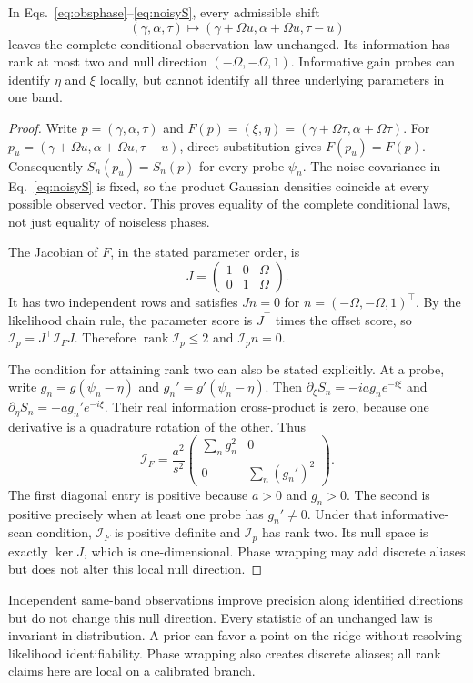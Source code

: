 \documentclass[submission,nolinenumbers]{esj}
\DeclareMathOperator{\rank}{rank}
\DeclareMathOperator{\Ker}{ker}
\begin{document}
\begin{proposition}\label{prop:orbit}
In Eqs.~\eqref{eq:obsphase}--\eqref{eq:noisyS}, every admissible shift
\[
(\gamma,\alpha,\tau)\longmapsto(\gamma+\Omega u,\alpha+\Omega u,\tau-u)
\]
leaves the complete conditional observation law unchanged. Its information has rank at most two and null direction $(-\Omega,-\Omega,1)$. Informative gain probes can identify $\eta$ and $\xi$ locally, but cannot identify all three underlying parameters in one band.
\end{proposition}
\begin{proof}
Write $p=(\gamma,\alpha,\tau)$ and $F(p)=(\xi,\eta)=(\gamma+\Omega\tau,\alpha+\Omega\tau)$. For $p_u=(\gamma+\Omega u,\alpha+\Omega u,\tau-u)$, direct substitution gives $F(p_u)=F(p)$. Consequently $S_n(p_u)=S_n(p)$ for every probe $\psi_n$. The noise covariance in Eq.~\eqref{eq:noisyS} is fixed, so the product Gaussian densities coincide at every possible observed vector. This proves equality of the complete conditional laws, not just equality of noiseless phases.

The Jacobian of $F$, in the stated parameter order, is
\[
J=\begin{pmatrix}1&0&\Omega\\0&1&\Omega\end{pmatrix}.
\]
It has two independent rows and satisfies $Jn=0$ for $n=(-\Omega,-\Omega,1)^\top$. By the likelihood chain rule, the parameter score is $J^\top$ times the offset score, so $\mathcal I_p=J^\top\mathcal I_FJ$. Therefore $\rank\mathcal I_p\le2$ and $\mathcal I_pn=0$.

The condition for attaining rank two can also be stated explicitly. At a probe, write $g_n=g(\psi_n-\eta)$ and $g_n'=g'(\psi_n-\eta)$. Then $\partial_\xi S_n=-ia g_ne^{-i\xi}$ and $\partial_\eta S_n=-a g_n'e^{-i\xi}$. Their real information cross-product is zero, because one derivative is a quadrature rotation of the other. Thus
\[
\mathcal I_F=\frac{a^2}{s^2}
\begin{pmatrix}\sum_n g_n^2&0\\0&\sum_n(g_n')^2\end{pmatrix}.
\]
The first diagonal entry is positive because $a>0$ and $g_n>0$. The second is positive precisely when at least one probe has $g_n'\ne0$. Under that informative-scan condition, $\mathcal I_F$ is positive definite and $\mathcal I_p$ has rank two. Its null space is exactly $\Ker J$, which is one-dimensional. Phase wrapping may add discrete aliases but does not alter this local null direction.
\end{proof}
Independent same-band observations improve precision along identified directions but do not change this null direction. Every statistic of an unchanged law is invariant in distribution. A prior can favor a point on the ridge without resolving likelihood identifiability. Phase wrapping also creates discrete aliases; all rank claims here are local on a calibrated branch.
\end{document}
